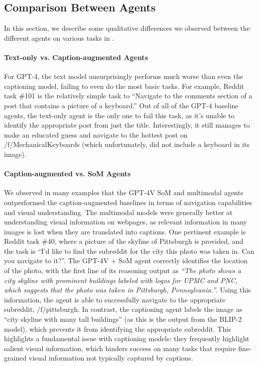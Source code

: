 \subsection{Comparison Between Agents}

In this section, we describe some qualitative differences we observed between the different agents on various tasks in \BenchmarkName{}.

\paragraph{Text-only vs. Caption-augmented Agents} For GPT-4, the text model unsurprisingly performs much worse than even the captioning model, failing to even do the most basic tasks. For example, Reddit task \#101 is the relatively simple task to ``Navigate to the comments section of a post that contains a picture of a keyboard.'' Out of all of the GPT-4 baseline agents, the text-only agent is the only one to fail this task, as it's unable to identify the appropriate post from just the title. Interestingly, it still manages to make an educated guess and navigate to the hottest post on /f/MechanicalKeyboards (which unfortunately, did not include a keyboard in its image).

\paragraph{Caption-augmented vs. SoM Agents} We observed in many examples that the GPT-4V SoM and multimodal agents outperformed the caption-augmented baselines in terms of navigation capabilities and visual understanding. The multimodal models were generally better at understanding visual information on webpages, as relevant information in many images is lost when they are translated into captions. One pertinent example is Reddit task \#40, where a picture of the skyline of Pittsburgh is provided, and the task is ``I'd like to find the subreddit for the city this photo was taken in. Can you navigate to it?''. The GPT-4V + SoM agent correctly identifies the location of the photo, with the first line of its reasoning output as \textit{``The photo shows a city skyline with prominent buildings labeled with logos for UPMC and PNC, which suggests that the photo was taken in Pittsburgh, Pennsylvania.''}. Using this information, the agent is able to successfully navigate to the appropriate subreddit, /f/pittsburgh. In contrast, the captioning agent labels the image as ``city skyline with many tall buildings'' (as this is the output from the BLIP-2 model), which prevents it from identifying the appropriate subreddit. This highlights a fundamental issue with captioning models: they frequently highlight salient visual information, which hinders success on many tasks that require fine-grained visual information not typically captured by captions.

